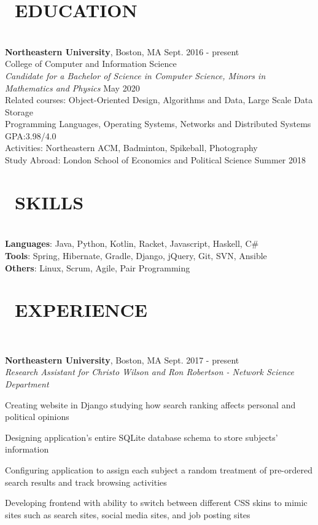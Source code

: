 \documentclass[11pt]{res}
\newcommand{\sectionunderline}{\vspace{-3mm}\hrulefill\\}
\newcommand{\listingtab}{\tabto{3.5cm}}
\newcommand{\newsect}[1]{\section{\Large \bf #1}}
\newcommand{\email}[1]{\faEnvelope\hspace{1mm} \href{mailto:#1}{#1}}
\newcommand{\phone}[1]{\faMobilePhone\hspace{1mm} #1}
\newcommand{\github}[1]{\faGithubAlt\hspace{1mm} \href{https://github.com/#1}{#1}}
\newcommand{\linkedin}[1]{\faLinkedinSquare\hspace{1mm} \href{https://linkedin.com/in/#1}{#1}}
\begin{document}
\address{
  \large\phone{(802) 503-5089}\:
  \large{$\bullet$}
  \large\email{derekpham67@gmail.com}\:
  \large{$\bullet$}
  \large\github{derekpham}\:
  \large{$\bullet$}
  \large\linkedin{derek-pham97}\\
  \normalsize Available: January - August 2019
}

\begin{resume}
  \newsect{\faGraduationCap\ EDUCATION}{
    \sectionunderline{
      {\bf Northeastern University}, Boston, MA \hfill Sept. 2016 - present\\
      College of Computer and Information Science}\\
                     {\it Candidate for a Bachelor of Science in Computer Science, Minors in Mathematics and Physics} \hfill May 2020
                     \vspace{2mm}\\
                     Related courses:
                     \listingtab Object-Oriented Design, Algorithms and Data, Large Scale Data Storage\\
                     \listingtab Programming Languages, Operating Systems, Networks and Distributed Systems\\
                     GPA:\listingtab 3.98/4.0\\
                     Activities: \listingtab Northeastern ACM, Badminton, Spikeball, Photography\\
                     Study Abroad: \listingtab London School of Economics and Political Science \hfill Summer 2018
  }

  \newsect{\faCogs\ SKILLS}{
    \sectionunderline{
      {\bf Languages}: \listingtab Java, Python, Kotlin, Racket, Javascript, Haskell, C\#\\
      {\bf Tools}: \listingtab Spring, Hibernate, Gradle, Django, jQuery, Git, SVN, Ansible\\
      {\bf Others}: \listingtab Linux, Scrum, Agile, Pair Programming
    }
  }

  \newsect{\faUsers\ EXPERIENCE}{
    \sectionunderline{
      {\bf Northeastern University}, Boston, MA \hfill Sept. 2017 - present\\
      {\it Research Assistant for Christo Wilson and Ron Robertson - Network Science Department}
      \begin{itemize}
        {\item Creating website in Django studying how search ranking affects personal and political opinions}
        {\item Designing application's entire SQLite database schema to store subjects' information}
        {\item Configuring application to assign each subject a random treatment of pre-ordered search results and track browsing activities}
        {\item Developing frontend with ability to switch between different CSS skins to mimic sites such as search sites, social media sites, and job posting sites}
      \end{itemize}

}}
\end{resume}
\end{document}
